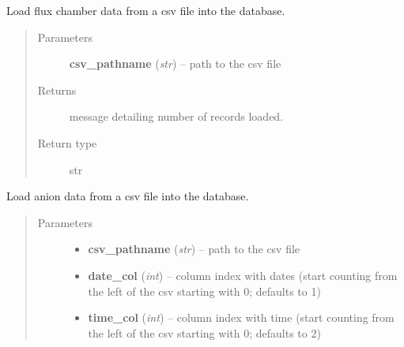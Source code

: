\documentclass[letterpaper,10pt,english]{sphinxmanual}
\begin{document}
\begin{fulllineitems}
\begin{fulllineitems}
\begin{quote}
\begin{description}
\end{description}\end{quote}

\end{fulllineitems}


\begin{fulllineitems}
\label{modules:webb_utils.upload_data.UploadData.load_flux_chamber_data}
Load flux chamber data from a csv file into the database.
\begin{quote}\begin{description}
\item[{Parameters}] \leavevmode
\textbf{csv\_pathname} (\emph{str}) -- path to the csv file

\item[{Returns}] \leavevmode
message detailing number of records loaded.

\item[{Return type}] \leavevmode
str

\end{description}\end{quote}

\end{fulllineitems}


\begin{fulllineitems}
\label{modules:webb_utils.upload_data.UploadData.load_gage_ht_meas_data}
Load anion data from a csv file into the database.
\begin{quote}\begin{description}
\item[{Parameters}] \leavevmode\begin{itemize}
\item {} 
\textbf{csv\_pathname} (\emph{str}) -- path to the csv file

\item {} 
\textbf{date\_col} (\emph{int}) -- column index with dates (start counting from the left of the csv starting with 0; defaults to 1)

\item {} 
\textbf{time\_col} (\emph{int}) -- column index with time (start counting from the left of the csv starting with 0; defaults to 2)


\end{itemize}
\end{description}
\end{quote}
\end{fulllineitems}
\end{fulllineitems}
\end{document}
